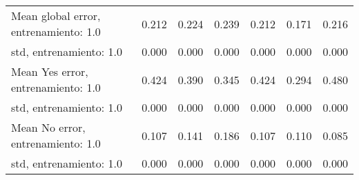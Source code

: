 \begin{longtable}{p{4cm}|p{1.5cm}|p{1.5cm}|p{1.5cm}|p{1.5cm}|p{1.5cm}|p{1.5cm}}
Mean global error, entrenamiento: 1.0 & 0.212 & 0.224 &        0.239 &     0.212 &     0.171 & 0.216 \\
std, entrenamiento: 1.0               & 0.000 & 0.000 &        0.000 &     0.000 &     0.000 & 0.000 \\
Mean Yes error, entrenamiento: 1.0    & 0.424 & 0.390 &        0.345 &     0.424 &     0.294 & 0.480 \\
std, entrenamiento: 1.0               & 0.000 & 0.000 &        0.000 &     0.000 &     0.000 & 0.000 \\
Mean No error, entrenamiento: 1.0     & 0.107 & 0.141 &        0.186 &     0.107 &     0.110 & 0.085 \\
std, entrenamiento: 1.0               & 0.000 & 0.000 &        0.000 &     0.000 &     0.000 & 0.000 \\
\end{longtable}
